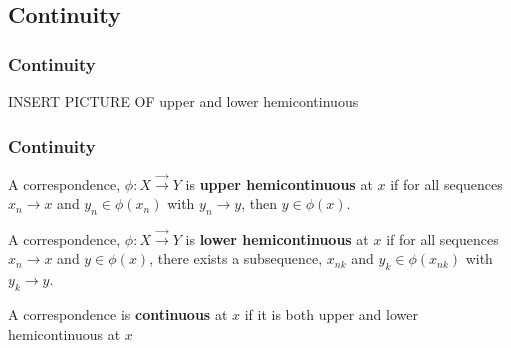 \documentclass[compress]{beamer}
\renewcommand{\to}{{\rightarrow}}
\newcommand{\corres}{\overrightarrow{\rightarrow}}
\begin{document}
\subsection{Continuity}
\begin{frame}\frametitle{Continuity}
  INSERT PICTURE OF upper and lower hemicontinuous  
\end{frame}

\begin{frame}\frametitle{Continuity}
  \begin{definition}
    A correspondence, $\phi: X \corres Y$ is \textbf{upper hemicontinuous} at $x$
    if for all sequences $x_n \to x$ and $y_n \in \phi(x_n)$ with $y_n
    \to y$, then $y \in \phi(x)$. 
  \end{definition}
  \begin{definition}
    A correspondence, $\phi: X \corres Y$ is \textbf{lower hemicontinuous} at $x$
    if for all sequences $x_n \to x$ and $y \in \phi(x)$, there exists a
    subsequence, $x_{nk}$ and $y_k \in \phi(x_{nk})$ with $y_k \to y$.  
  \end{definition}
  \begin{definition}
    A correspondence is \textbf{continuous} at $x$ if it is both upper
    and lower hemicontinuous at $x$
  \end{definition}
\end{frame}
\end{document}
